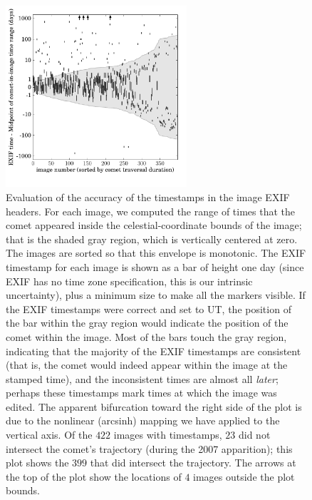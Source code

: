 \documentclass[12pt,preprint]{aastex}
\begin{document}
\clearpage
\begin{figure}
\begin{center}
\includegraphics[width=0.6\textwidth]{exif10.pdf}
\end{center}
\caption[exif times mostly correct]{Evaluation of the accuracy of the
  timestamps in the image EXIF headers.  For each image, we computed
  the range of times that the comet appeared inside the
  celestial-coordinate bounds of the image; that is the shaded gray
  region, which is vertically centered at zero.  The images are sorted
  so that this envelope is monotonic.  The EXIF timestamp for each
  image is shown as a bar of height one day (since EXIF has no time
  zone specification, this is our intrinsic uncertainty), plus a
  minimum size to make all the markers visible.  If the EXIF
  timestamps were correct and set to UT, the position of the bar
  within the gray region would indicate the position of the comet
  within the image.  Most of the bars touch the gray region,
  indicating that the majority of the EXIF timestamps are consistent
  (that is, the comet would indeed appear within the image at the
  stamped time), and the inconsistent times are almost all
  \emph{later}; perhaps these timestamps mark times at which the image
  was edited.  The apparent bifurcation toward the right side of the
  plot is due to the nonlinear (arcsinh) mapping we have applied to
  the vertical axis.  Of the $422$ images with timestamps, $23$ did
  not intersect the comet's trajectory (during the 2007 apparition);
  this plot shows the $399$ that did intersect the trajectory.  The
  arrows at the top of the plot show the locations of $4$ images
  outside the plot bounds.\label{fig:exiftimes}}
\end{figure}
\end{document}
